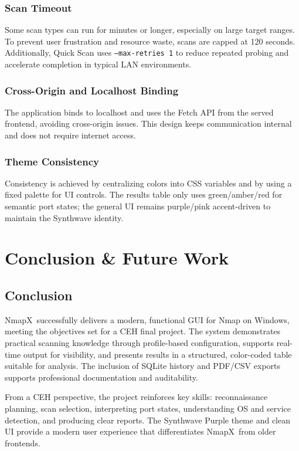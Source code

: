 \documentclass[12pt, a4paper]{report}
\newcommand{\NmapX}{NmapX}
\begin{document}
\subsection{Scan Timeout}
Some scan types can run for minutes or longer, especially on large target ranges. To prevent user frustration and resource waste, scans are capped at 120 seconds. Additionally, Quick Scan uses \texttt{--max-retries 1} to reduce repeated probing and accelerate completion in typical LAN environments.

\subsection{Cross-Origin and Localhost Binding}
The application binds to localhost and uses the Fetch API from the served frontend, avoiding cross-origin issues. This design keeps communication internal and does not require internet access.

\subsection{Theme Consistency}
Consistency is achieved by centralizing colors into CSS variables and by using a fixed palette for UI controls. The results table only uses green/amber/red for semantic port states; the general UI remains purple/pink accent-driven to maintain the Synthwave identity.

\clearpage
\chapter{Conclusion \& Future Work}

\section{Conclusion}
\NmapX\ successfully delivers a modern, functional GUI for Nmap on Windows, meeting the objectives set for a CEH final project. The system demonstrates practical scanning knowledge through profile-based configuration, supports real-time output for visibility, and presents results in a structured, color-coded table suitable for analysis. The inclusion of SQLite history and PDF/CSV exports supports professional documentation and auditability.

From a CEH perspective, the project reinforces key skills: reconnaissance planning, scan selection, interpreting port states, understanding OS and service detection, and producing clear reports. The Synthwave Purple theme and clean UI provide a modern user experience that differentiates \NmapX\ from older frontends.
\end{document}
